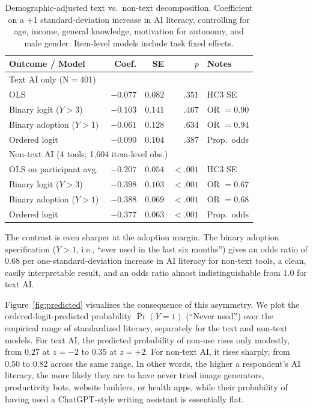 \documentclass[11pt]{article}
\begin{document}
\begin{table}[t]
  \centering
  \caption{Demographic-adjusted text vs.\ non-text decomposition. Coefficient
    on a +1 standard-deviation increase in AI literacy, controlling for age,
    income, general knowledge, motivation for autonomy, and male gender.
    Item-level models include task fixed effects.}
  \label{tab:decomposition}
  \begin{tabular}{lrrrl}
    \toprule
    \textbf{Outcome / Model} & \textbf{Coef.} & \textbf{SE} & \textbf{$p$} & \textbf{Notes} \\
    \midrule
    \multicolumn{5}{l}{Text AI only (N$=$401)} \\
    \quad OLS                              & $-0.077$ & $0.082$ & $.351$ & HC3 SE       \\
    \quad Binary logit ($Y > 3$)           & $-0.103$ & $0.141$ & $.467$ & OR $= 0.90$ \\
    \quad Binary adoption ($Y > 1$)        & $-0.061$ & $0.128$ & $.634$ & OR $= 0.94$ \\
    \quad Ordered logit                    & $-0.090$ & $0.104$ & $.387$ & Prop.\ odds \\
    \midrule
    \multicolumn{5}{l}{Non-text AI (4 tools; 1{,}604 item-level obs.)} \\
    \quad OLS on participant avg.\         & $-0.207$ & $0.054$ & $< .001$ & HC3 SE      \\
    \quad Binary logit ($Y > 3$)           & $-0.398$ & $0.103$ & $< .001$ & OR $= 0.67$ \\
    \quad Binary adoption ($Y > 1$)        & $-0.388$ & $0.069$ & $< .001$ & OR $= 0.68$ \\
    \quad Ordered logit                    & $-0.377$ & $0.063$ & $< .001$ & Prop.\ odds \\
    \bottomrule
  \end{tabular}
\end{table}

The contrast is even sharper at the adoption margin. The binary adoption
specification ($Y > 1$, i.e., ``ever used in the last six months'') gives an
odds ratio of $0.68$ per one-standard-deviation increase in AI literacy for
non-text tools, a clean, easily interpretable result, and an odds ratio
almost indistinguishable from $1.0$ for text AI.

Figure~\ref{fig:predicted} visualizes the consequence of this asymmetry. We
plot the ordered-logit-predicted probability $\Pr(Y = 1)$ (``Never used'')
over the empirical range of standardized literacy, separately for the text
and non-text models. For text AI, the predicted probability of non-use rises
only modestly, from $0.27$ at $z = -2$ to $0.35$ at $z = +2$. For non-text
AI, it rises sharply, from $0.50$ to $0.82$ across the same range. In other
words, the higher a respondent's AI literacy, the more likely they are to
have never tried image generators, productivity bots, website builders, or
health apps, while their probability of having used a ChatGPT-style writing
assistant is essentially flat.
\end{document}
